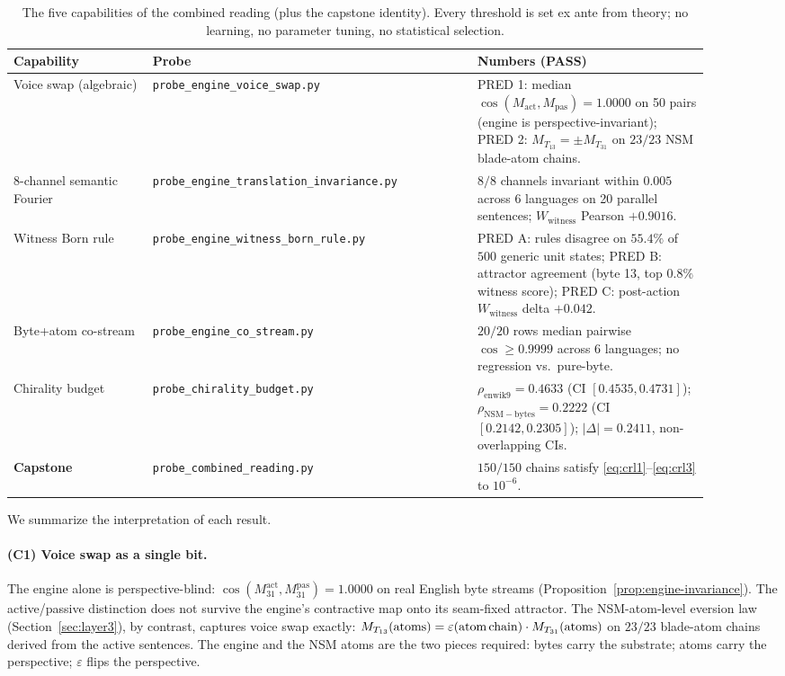 \documentclass[11pt,a4paper]{article}
\theoremstyle{plain}
\theoremstyle{definition}
\theoremstyle{remark}
\numberwithin{equation}{section}
\providecommand{\eps}{\varepsilon}
\begin{document}
\begin{table}[h!]
\centering
\small
\begin{tabular}{p{0.18\linewidth} p{0.42\linewidth} p{0.30\linewidth}}
\toprule
\textbf{Capability} & \textbf{Probe} & \textbf{Numbers (PASS)} \\
\midrule
Voice swap (algebraic) &
   \texttt{probe\_engine\_voice\_swap.py} &
   PRED 1: median $\cos(M_{\mathrm{act}},M_{\mathrm{pas}}) = 1.0000$ on 50
   pairs (engine is perspective-invariant); PRED 2:
   $M_{T_{13}} = \pm M_{T_{31}}$ on $23/23$ NSM blade-atom chains. \\
\midrule
8-channel semantic Fourier &
   \texttt{probe\_engine\_translation\_invariance.py} &
   $8/8$ channels invariant within $0.005$ across 6 languages on 20
   parallel sentences; $W_{\mathrm{witness}}$ Pearson $+0.9016$. \\
\midrule
Witness Born rule &
   \texttt{probe\_engine\_witness\_born\_rule.py} &
   PRED A: rules disagree on $55.4\%$ of $500$ generic unit states;
   PRED B: attractor agreement (byte 13, top $0.8\%$ witness score);
   PRED C: post-action $W_{\mathrm{witness}}$ delta $+0.042$. \\
\midrule
Byte+atom co-stream &
   \texttt{probe\_engine\_co\_stream.py} &
   $20/20$ rows median pairwise $\cos \geq 0.9999$ across 6 languages;
   no regression vs.\ pure-byte. \\
\midrule
Chirality budget &
   \texttt{probe\_chirality\_budget.py} &
   $\rho_{\mathrm{enwik9}} = 0.4633$ (CI $[0.4535, 0.4731]$);
   $\rho_{\mathrm{NSM-bytes}} = 0.2222$ (CI $[0.2142, 0.2305]$);
   $|\Delta| = 0.2411$, non-overlapping CIs. \\
\midrule
\textbf{Capstone} & \texttt{probe\_combined\_reading.py} &
   $150/150$ chains satisfy
   \eqref{eq:crl1}--\eqref{eq:crl3} to $10^{-6}$. \\
\bottomrule
\end{tabular}
\caption{The five capabilities of the combined reading
(plus the capstone identity).  Every threshold is set ex ante from
theory; no learning, no parameter tuning, no statistical
selection.}\label{tab:capabilities}
\end{table}

We summarize the interpretation of each result.

\paragraph{(C1) Voice swap as a single bit.}
The engine alone is perspective-blind: $\cos(M_{31}^{\mathrm{act}},
M_{31}^{\mathrm{pas}}) = 1.0000$ on real English byte streams
(Proposition~\ref{prop:engine-invariance}).  The active/passive
distinction does not survive the engine's contractive map onto its
seam-fixed attractor.  The NSM-atom-level eversion law
(Section~\ref{sec:layer3}), by contrast, captures voice swap
exactly: $M_{T_{13}}(\text{atoms}) = \eps(\text{atom\,chain}) \cdot
M_{T_{31}}(\text{atoms})$ on $23/23$ blade-atom chains derived from
the active sentences.  The engine and the NSM atoms are the two
pieces required: bytes carry the substrate; atoms carry the
perspective; $\eps$ flips the perspective.
\end{document}
